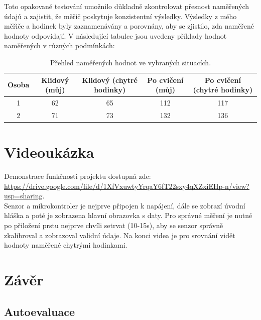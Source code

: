 \documentclass[11pt,a4paper]{article}
\begin{document}
Toto opakované testování umožnilo důkladně zkontrolovat přesnost naměřených údajů a zajistit, že měřič poskytuje konzistentní výsledky. Výsledky z mého měřiče a hodinek byly zaznamenávány a porovnány, aby se zjistilo, zda naměřené hodnoty odpovídají. V následující tabulce jsou uvedeny příklady hodnot naměřených v různých podmínkách:

\begin{table}[H]
\centering
\begin{tabular}{|c|c|c|c|c|}
\hline
\textbf{Osoba} & \textbf{Klidový (můj)} & \textbf{Klidový (chytré hodinky)} & \textbf{Po cvičení (můj)} & \textbf{Po cvičení (chytré hodinky)} \\ \hline
1              & 62                     & 65                               & 112                       & 117                                   \\ \hline
2              & 71                     & 73                               & 132                       & 136                                   \\ \hline
\end{tabular}
\caption{Přehled naměřených hodnot ve vybraných situacích.}
\end{table}


\section{Videoukázka}

Demonstrace funkčnosti projektu dostupná zde: \\ \url{https://drive.google.com/file/d/1XfVxuwtyYrqaY6fT22sxy4qXZxiEHp-n/view?usp=sharing}.\\ Senzor a mikrokontroler je nejprve připojen k napájení, dále se zobrazí úvodní hláška a poté je zobrazena hlavní obrazovka s daty. Pro správné měření je nutné po přiložení prstu nejprve chvíli setrvat (10-15s), aby se senzor správně zkalibroval a zobrazoval validní údaje. Na konci videa je pro srovnání vidět hodnoty naměřené chytrými hodinkami.

\section{Závěr}
\subsection{Autoevaluace}
\end{document}
